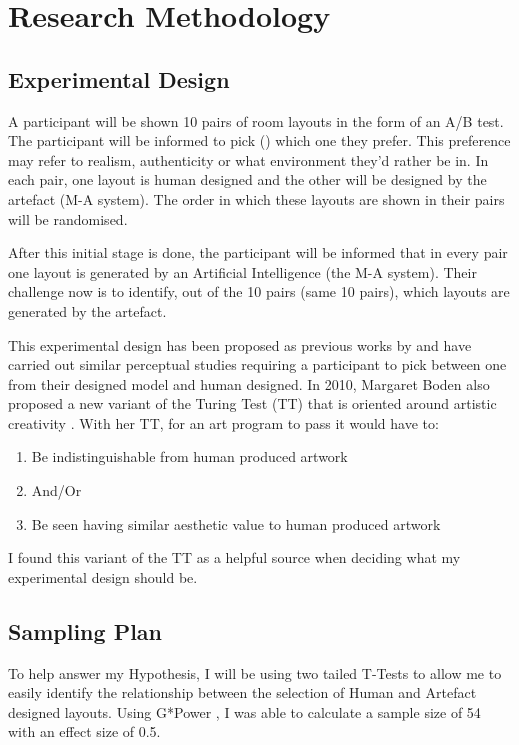 \section{Research Methodology}

\subsection{Experimental Design}
A participant will be shown 10 pairs of room layouts in the form of an A/B test. The participant will be informed to pick () which one they prefer.
This preference may refer to realism, authenticity or what environment they'd rather be in. In each pair, one layout is human designed and the other will be designed by the artefact (M-A system). The order in which these layouts are shown in their pairs will be randomised.

After this initial stage is done, the participant will be informed that in every pair one layout is generated by an Artificial Intelligence (the M-A system). Their challenge now is to identify, out of the 10 pairs (same 10 pairs), which layouts are generated by the artefact.

This experimental design has been proposed as previous works by  \cite{constrained-layouts} and  \cite{make-it-home} have carried out similar perceptual studies requiring a participant to pick between one from their designed model and human designed. In 2010, Margaret Boden also proposed a new variant of the Turing Test (TT) that is oriented around artistic creativity \cite{artistic-tt}. With her TT, for an art program to pass it would have to:
\begin{enumerate}
    \item Be indistinguishable from human produced artwork
    \item[]And/Or
    \item Be seen having similar aesthetic value to human produced artwork
\end{enumerate}
I found this variant of the TT as a helpful source when deciding what my experimental design should be.

\subsection{Sampling Plan}
To help answer my Hypothesis, I will be using two tailed T-Tests to allow me to easily identify the relationship between the selection of Human and Artefact designed layouts.
Using G*Power \cite{gpower}, I was able to calculate a sample size of 54 with an effect size of 0.5. 

